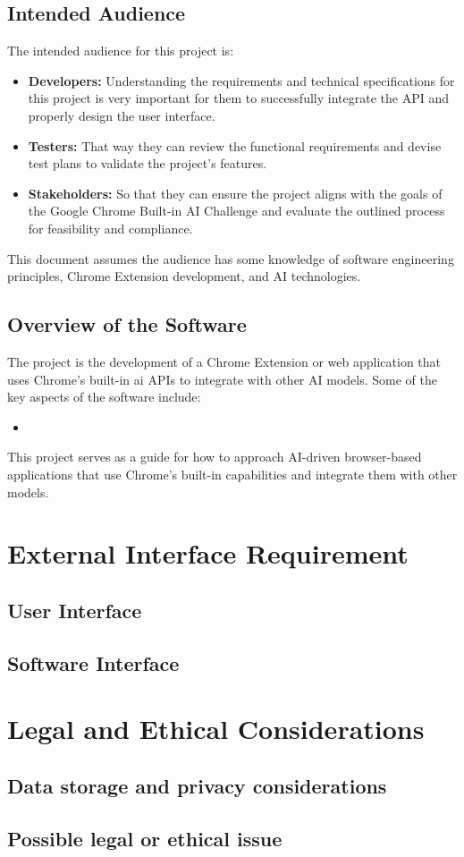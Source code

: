 \documentclass{article}
\begin{document}
\subsection{Intended Audience}
The intended audience for this project is:
\begin{itemize}
    \item \textbf{Developers:} Understanding the requirements and technical specifications for this project is very important for them to successfully integrate the API and properly design the user interface.
    \item \textbf{Testers:} That way they can review the functional requirements and devise test plans to validate the project's features.
    \item \textbf{Stakeholders:} So that they can ensure the project aligns with the goals of the Google Chrome Built-in AI Challenge and evaluate the outlined process for feasibility and compliance.
\end{itemize}

This document assumes the audience has some knowledge of software engineering principles, Chrome Extension development, and AI technologies.

\subsection{Overview of the Software}
The project is the development of a Chrome Extension or web application that uses Chrome's built-in \Gls{ai} APIs to integrate with other AI models. Some of the key aspects of the software include:

\begin{itemize}
    \item \lipsum[1]
\end{itemize}

This project serves as a guide for how to approach AI-driven browser-based applications that use Chrome's built-in capabilities and integrate them with other models.

\section{External Interface Requirement}
\subsection{User Interface}

\subsection{Software Interface}


\section{Legal and Ethical Considerations}
\subsection{Data storage and privacy considerations}

\subsection{Possible legal or ethical issue}

\printglossaries
\end{document}
